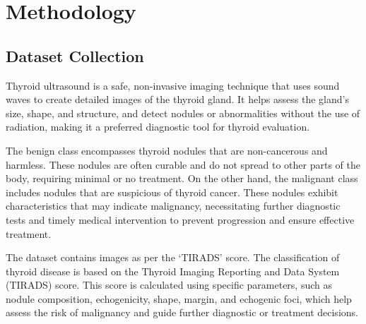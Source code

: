 \setlength{\parindent}{2em}

\chapter{Methodology}
    \section{Dataset Collection}
    \noindent
    Thyroid ultrasound is a safe, non-invasive imaging technique that uses sound waves to create detailed images of the thyroid gland. It helps assess the gland's size, shape, and structure, and detect nodules or abnormalities without the use of radiation, making it a preferred diagnostic tool for thyroid evaluation.
    \par \noindent The benign class encompasses thyroid nodules that are non-cancerous and harmless. These nodules are often curable and do not spread to other parts of the body, requiring minimal or no treatment. On the other hand, the malignant class includes nodules that are suspicious of thyroid cancer. These nodules exhibit characteristics that may indicate malignancy, necessitating further diagnostic tests and timely medical intervention to prevent progression and ensure effective treatment.
    \par \noindent The dataset contains images as per the ‘TIRADS’ score. The classification of thyroid disease is based on the Thyroid Imaging Reporting and Data System (TIRADS) score. This score is calculated using specific parameters, such as nodule composition, echogenicity, shape, margin, and echogenic foci, which help assess the risk of malignancy and guide further diagnostic or treatment decisions.
    

